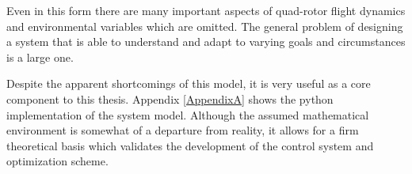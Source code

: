 Even in this form there are many important aspects of quad-rotor flight dynamics and environmental variables which are omitted. The general problem of designing a system that is able to understand and adapt to varying goals and circumstances is a large one.

Despite the apparent shortcomings of this model, it is very useful as a core component to this thesis.  Appendix \ref{AppendixA} shows the python implementation of the system model. Although the assumed mathematical environment is somewhat of a departure from reality, it allows for a firm theoretical basis which validates the development of the control system and optimization scheme.





